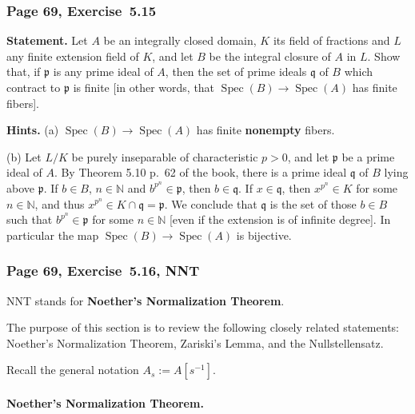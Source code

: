 \documentclass[12pt,letterpaper]{article}%
\newcommand{\mf}{\mathfrak}
\newcommand{\ppp}{\mf p}
\newcommand{\qqq}{\mf q}
\newcommand{\Spec}{\operatorname{Spec}}\newcommand{\Sp}{\operatorname{Spec}}
\newcommand{\nn}{\noindent}
\begin{document}
\subsubsection{Page 69, Exercise~5.15}%

\textbf{Statement.} Let $A$ be an integrally closed domain, $K$ its field of fractions and $L$ any finite extension field of $K$, and let $B$ be the integral closure of $A$ in $L$. Show that, if $\ppp$ is any prime ideal of $A$, then the set of prime ideals $\qqq$ of $B$ which contract to $\ppp$ is finite [in other words, that $\Spec(B)\to\Spec(A)$ has finite fibers].

\nn[Reduce to the two cases (a) $L$ separable over $K$ and (b) $L$ purely inseparable over $K$. In case (a), embed $L$ in a finite normal separable extension of $K$, and use Exercises 13 and 14. In case (b), if $\qqq$ is a prime ideal of $B$ such that $\qqq\cap A =\ppp$, show that $\qqq$ is the set of all $x\in B$ such that $x^{p^m}\in\ppp$ for some $m\ge0$, where $p$ is the characteristic of $K$, and hence that $\Spec(B)\to\Spec(A)$ is bijective in this case.]

\nn\textbf{Hints.} (a) $\Spec(B)\to\Spec(A)$ has finite \textbf{nonempty} fibers.

\nn(b) Let $L/K$ be purely inseparable of characteristic $p>0$, and let $\ppp$ be a prime ideal of $A$. By Theorem 5.10 p.~62 of the book, there is a prime ideal $\qqq$ of $B$ lying above $\ppp$. If $b\in B$, $n\in\mathbb N$ and $b^{p^n}\in\ppp$, then $b\in\qqq$. If $x\in\qqq$, then $x^{p^n}\in K$ for some $n\in\mathbb N$, and thus $x^{p^n}\in K\cap\qqq=\ppp$. We conclude that $\qqq$ is the set of those $b\in B$ such that $b^{p^n}\in\ppp$ for some $n\in\mathbb N$ [even if the extension is of infinite degree]. In particular the map $\Spec(B)\to\Spec(A)$ is bijective.

\subsubsection{Page 69, Exercise~5.16, NNT}\label{ex5.16}%

NNT stands for \textbf{Noether's Normalization Theorem}.

The purpose of this section is to review the following closely related statements: Noether's Normalization Theorem, Zariski's Lemma, and the Nullstellensatz. 

Recall the general notation $A_s:=A[s^{-1}]$.%

\paragraph{Noether's Normalization Theorem.}%
\end{document}
